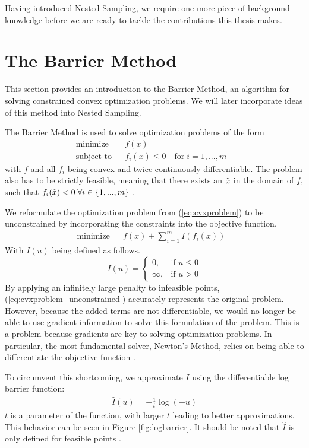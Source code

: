 \documentclass[12pt, a4paper]{report}
\begin{document}
Having introduced Nested Sampling, we require one more piece of background knowledge before we are ready to tackle the contributions this thesis makes.
\FloatBarrier
\section{The Barrier Method}
This section provides an introduction to the Barrier Method, an algorithm for solving constrained convex optimization problems.
We will later incorporate ideas of this method into Nested Sampling.

The Barrier Method is used to solve optimization problems of the form
\begin{align}
    &\textrm{minimize} && f(x) && \nonumber\\
    &\textrm{subject to}  && f_i(x) \leq 0 \quad \textrm{for} \; i=1,...,m &&
    \label{eq:cvxproblem}
\end{align}
with $f$ and all $f_i$ being convex and twice continuously differentiable.
The problem also has to be strictly feasible, meaning that there exists an $\Tilde{x}$ in the domain of $f$, such that $f_i(\Tilde{x}) < 0 \; \forall i \in \{1,...,m\}$ \cite[561]{boyd}.

We reformulate the optimization problem from (\ref{eq:cvxproblem}) to be unconstrained by incorporating the constraints into the objective function.
\begin{align}
    &\textrm{minimize} && f(x) + \sum_{i=1}^m I(f_i(x))&& \label{eq:cvxproblem_unconstrained}
\end{align}
With $I(u)$ being defined as follows.
\begin{equation}
    I(u) = \begin{cases}
        0,      & \text{if }  u \leq 0\\
        \infty, & \text{if }  u > 0
        \end{cases} \label{eq:exact_barrier_function}
\end{equation}
By applying an infinitely large penalty to infeasible points, (\ref{eq:cvxproblem_unconstrained}) accurately represents the original problem.
However, because the added terms are not differentiable, we would no longer be able to use gradient information to solve this formulation of the problem.
This is a problem because gradients are key to solving optimization problems.
In particular, the most fundamental solver, Newton's Method, relies on being able to differentiate the objective function \cite[563]{boyd}.

To circumvent this shortcoming, we approximate $I$ using the differentiable log barrier function:
\begin{align}
    \hat{I}(u)= -\frac{1}{t}\log(-u) \label{eq:log_barrier_function}
\end{align}
$t$ is a parameter of the function, with larger $t$ leading to better approximations.
This behavior can be seen in Figure \ref{fig:logbarrier}.
It should be noted that $\hat{I}$ is only defined for feasible points \cite[563]{boyd}.
\end{document}
